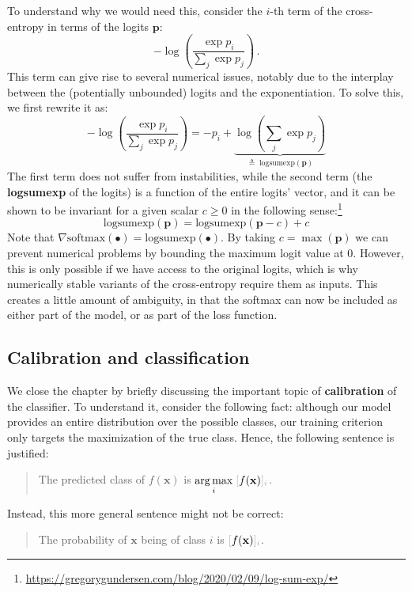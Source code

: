 To understand why we would need this, consider the $i$-th term of the cross-entropy in terms of the logits $\mathbf{p}$:
%
$$
- \log\left( \frac{\exp{p_i}}{\sum_j \exp{p_j}} \right) \,.
$$
%
This term can give rise to several numerical issues, notably due to the interplay between the (potentially unbounded) logits and the exponentiation. To solve this, we first rewrite it as:
%
$$
- \log\left( \frac{\exp{p_i}}{\sum_j \exp{p_j}} \right) = -p_i + \underbrace{\log\left(\sum_j \exp p_j\right)}_{\triangleq \; \text{logsumexp}(\mathbf{p})}
$$
%
The first term does not suffer from instabilities, while the second term (the \textbf{logsumexp} of the logits) is a function of the entire logits’ vector, and it can be shown to be invariant for a given scalar $c \ge 0$ in the following sense:\footnote{\url{https://gregorygundersen.com/blog/2020/02/09/log-sum-exp/}}
%
$$
\text{logsumexp}(\mathbf{p})=\text{logsumexp}(\mathbf{p} - c) +c
$$
%
Note that $\nabla \text{softmax}(\bullet) = \text{logsumexp}(\bullet)$. By taking $c = \max(\mathbf{p})$ we can prevent numerical problems by bounding the maximum logit value at $0$. However, this is only possible if we have access to the original logits, which is why numerically stable variants of the cross-entropy require them as inputs. This creates a little amount of ambiguity, in that the softmax can now be included as either part of the model, or as part of the loss function.

\subsection{Calibration and classification}

We close the chapter by briefly discussing the important topic of \textbf{calibration} of the classifier. To understand it, consider the following fact: although our model provides an entire distribution over the possible classes, our training criterion only targets the maximization of the true class. Hence, the following sentence is justified:

\begin{quote}The predicted class of $f(\mathbf{x})$ is $\underset{i}{\arg\max} \; \idx{f(\mathbf{x})}{i}$.\end{quote}

Instead, this more general sentence might not be correct:

\begin{quote} The probability of $\mathbf{x}$ being of class $i$ is $\idx{f(\mathbf{x})}{i}$.\end{quote}

